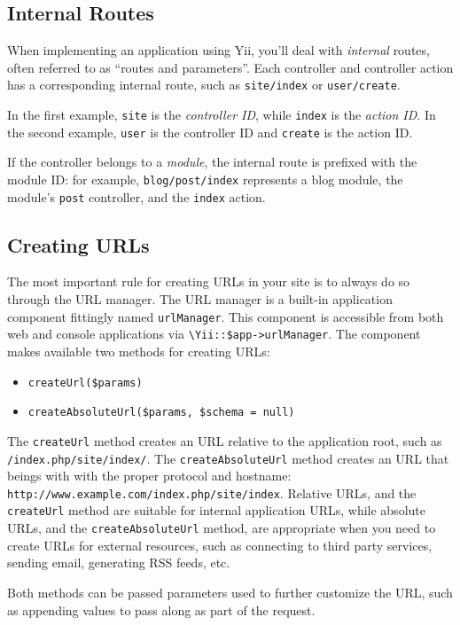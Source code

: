 \subsection{Internal Routes}
When implementing an application using Yii, you'll deal with \textit{internal} routes, often referred to as ``routes and parameters''.
Each controller and controller action has a corresponding internal route, such as \lstinline|site/index| or \lstinline|user/create|.

In the first example, \lstinline|site| is the \textit{controller ID}, while \lstinline|index| is the \textit{action ID}. In the
second example, \lstinline|user| is the controller ID and \lstinline|create| is the action ID. 

If the controller belongs to a \textit{module}, the
internal route is prefixed with the module ID: for example, \lstinline|blog/post/index| represents a blog module, the module's \lstinline|post| 
controller, and the \lstinline|index| action.

\subsection{Creating URLs}
The most important rule for creating URLs in your site is to always do so through the URL manager. The URL manager is a built-in application component fittingly named \lstinline|urlManager|. This component is accessible from both web and console applications via
\lstinline|\Yii::$app->urlManager|. The component makes available two methods for creating URLs:

\begin{itemize}
\item \lstinline|createUrl($params)|
\item \lstinline|createAbsoluteUrl($params, $schema = null)|
\end{itemize}
The \lstinline|createUrl| method creates an URL relative to the application root, such as \lstinline|/index.php/site/index/|.
The \lstinline|createAbsoluteUrl| method creates an URL that beings with with the proper protocol and hostname:
\lstinline|http://www.example.com/index.php/site/index|. Relative URLs, and the \lstinline|createUrl| method are suitable for internal application URLs, while absolute URLs, and the \lstinline|createAbsoluteUrl| method, are appropriate when you need to create URLs for external resources, such as connecting to third party services, sending email,
generating RSS feeds, etc.

Both methods can be passed parameters used to further customize the URL, such as appending values to pass along as part of the request.

